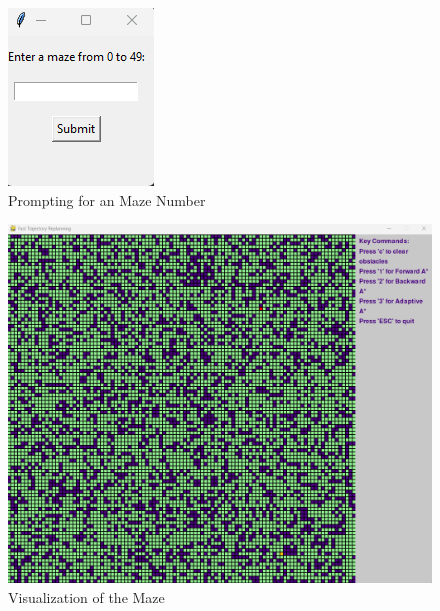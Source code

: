 \begin{figure}[h]
    \centering
    \includegraphics[width=.25\linewidth]{imgs/maze_prompt.png}
    \caption{Prompting for an Maze Number}
    \label{fig:my_label}
\end{figure}
\begin{figure}[h]
    \centering
    \includegraphics[width=.85\linewidth]{imgs/FRT.png}
    \caption{Visualization of the Maze}
    \label{fig:my_label}
\end{figure}


